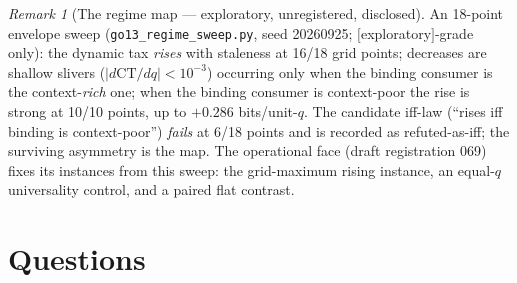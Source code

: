 ﻿\documentclass[11pt]{article}
\theoremstyle{remark}
\newtheorem{remark}{Remark}
\begin{document}
\begin{remark}[The regime map --- exploratory, unregistered,
disclosed]
An 18-point envelope sweep (\texttt{go13\_regime\_sweep.py}, seed
20260925; $[$exploratory$]$-grade only): the dynamic tax \emph{rises}
with staleness at 16/18 grid points; decreases are shallow slivers
($|d\mathrm{CT}/dq|<10^{-3}$) occurring only when the binding consumer
is the context-\emph{rich} one; when the binding consumer is
context-poor the rise is strong at 10/10 points, up to $+0.286$
bits/unit-$q$. The candidate iff-law (``rises iff binding is
context-poor'') \emph{fails} at 6/18 points and is recorded as
refuted-as-iff; the surviving asymmetry is the map. The operational
face (draft registration 069) fixes its instances from this sweep:
the grid-maximum rising instance, an equal-$q$ universality control,
and a paired flat contrast.
\end{remark}

\section{Questions}
\end{document}
